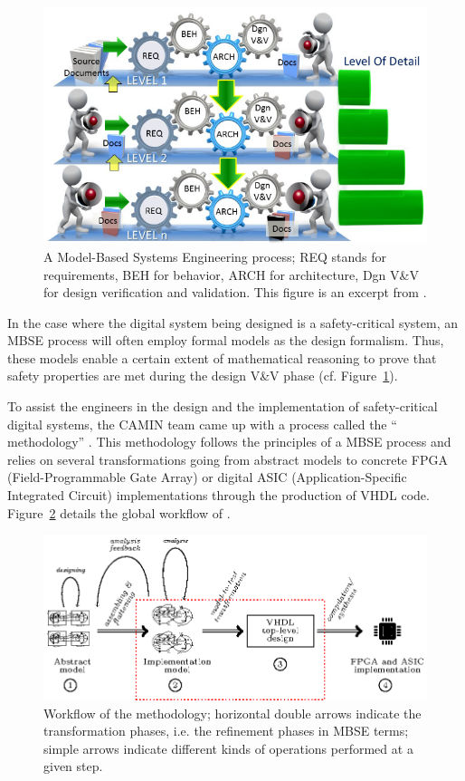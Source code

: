 \documentclass[pdflatex,sn-mathphys]{sn-jnl}%
\theoremstyle{thmstyleone}%
\theoremstyle{thmstyletwo}%
\theoremstyle{thmstylethree}%
\begin{document}
\begin{figure}[H] \centering
\includegraphics[keepaspectratio,width=.6\textwidth]{MBSE-ps.png}
  \caption[A Model-Based Systems Engineering process.]{A Model-Based
Systems Engineering process; REQ stands for requirements, BEH for
behavior, ARCH for architecture, Dgn V\&V for design verification and
validation. This figure is an excerpt from \cite{Long2011}.}
  \label{fig:MBSE-ps}
\end{figure}

In the case where the digital system being designed is a
safety-critical system, an MBSE process will often employ formal
models as the design formalism. Thus, these models enable a certain
extent of mathematical reasoning to prove that safety properties are
met during the design V\&V phase (cf. Figure~\ref{fig:MBSE-ps}).

To assist the engineers in the design and the implementation of
safety-critical digital systems, the CAMIN team came up with a process
called the ``\hilecop{} methodology'' \cite{Andreu2009}.  This
methodology follows the principles of a MBSE process and relies on
several transformations going from abstract models to concrete FPGA
(Field-Programmable Gate Array) or digital ASIC (Application-Specific
Integrated Circuit) implementations through the production of VHDL
code. Figure~\ref{fig:hilecop-wf} details the global workflow of
\hilecop{}.

\begin{figure}[H]
\centering
\includegraphics[keepaspectratio=true,width=\textwidth]{hilecop-wf.eps}
\caption[Workflow of the \hilecop{} methodology.]{Workflow of the
  \hilecop{} methodology; horizontal double arrows indicate the
  transformation phases, i.e. the refinement phases in MBSE terms;
  simple arrows indicate different kinds of operations performed at a
  given step.}
\label{fig:hilecop-wf}
\end{figure}
\end{document}
